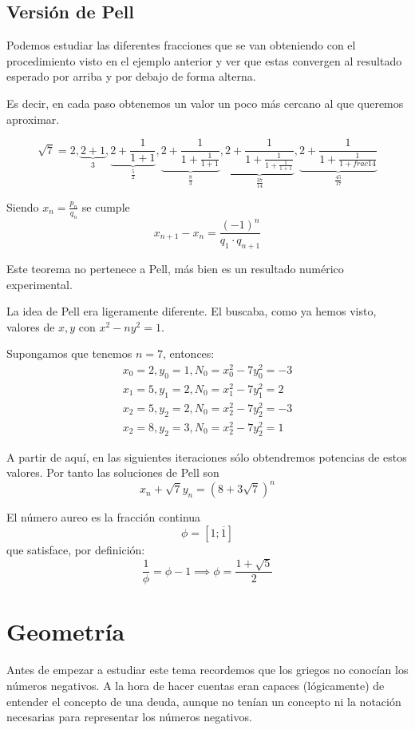 \documentclass{apuntes}
\begin{document}
\section{Versión de Pell}
Podemos estudiar las diferentes fracciones que se van obteniendo con el procedimiento visto en el ejemplo anterior y ver que estas convergen al resultado esperado por arriba y por debajo de forma alterna.

Es decir, en cada paso obtenemos un valor un poco más cercano al que queremos aproximar.

\[\sqrt{7} = 2, \underbrace{2+1}_{3}, \underbrace{2+\frac{1}{1+1}}_{\frac{5}{2}}, \underbrace{2+\frac{1}{1+\frac{1}{1+1}}}_{\frac{8}{3}},  \underbrace{2+\frac{1}{1+\frac{1}{1+\frac{1}{1+1}}}}_{\frac{37}{14}},  \underbrace{2+\frac{1}{1+\frac{1}{1+frac{1}{4}}}}_{\frac{45}{17}}\]

\begin{theorem}
Siendo $x_n = \frac{p_n}{q_n}$ se cumple
\[x_{n+1}-x_n = \frac{(-1)^n}{q_1 \cdot q_{n+1}}\]
\end{theorem}

Este teorema no pertenece a Pell, más bien es un resultado numérico experimental. 

La idea de Pell era ligeramente diferente. El buscaba, como ya hemos visto, valores de $x,y$ con $x^2-ny^2 = 1$.

Supongamos que tenemos $n=7$, entonces:
\[\begin{array}{l}
x_0=2, y_0 =1, N_0 = x_0^2-7y_0^2 = -3 \\
x_1=5, y_1 =2, N_0 = x_1^2-7y_1^2 = 2 \\
x_2=5, y_2 =2, N_0 = x_2^2-7y_2^2 = -3 \\
x_2=8, y_2 =3, N_0 = x_2^2-7y_2^2 = 1 
\end{array}\]

A partir de aquí, en las siguientes iteraciones sólo obtendremos potencias de estos valores. Por tanto las soluciones de Pell son
\[x_n + \sqrt{7}y_n = \left(8 + 3 \sqrt{7}\right)^n\]

\begin{defn}
El número aureo es la fracción continua
\[\phi=[1;\overline{1}]\]
que satisface, por definición:
\[\frac{1}{\phi} = \phi -1 \implies \phi = \frac{1+\sqrt{5}}{2}\]
\end{defn}

\chapter{Geometría}
Antes de empezar a estudiar este tema recordemos que los griegos no conocían los números negativos. A la hora de hacer cuentas eran capaces (lógicamente) de entender el concepto de una deuda, aunque no tenían un concepto ni la notación necesarias para representar los números negativos.
\end{document}
